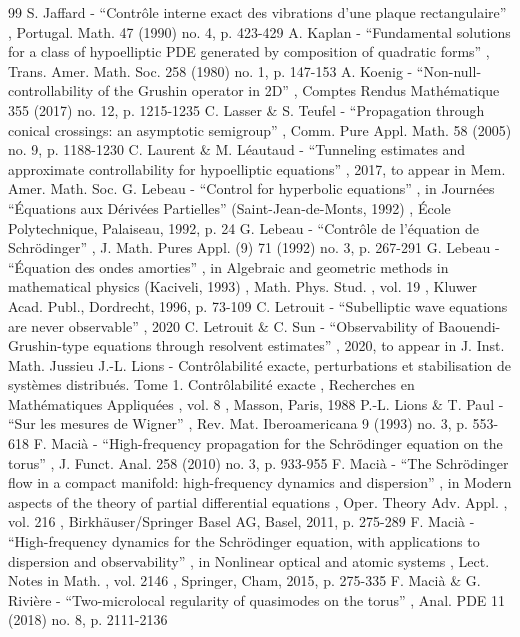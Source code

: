 \begin{thebibliography}{99}
 S. Jaffard - “Contrôle interne exact des vibrations d’une plaque rectangulaire” , Portugal. Math. 47 (1990) no. 4, p. 423-429
 A. Kaplan - “Fundamental solutions for a class of hypoelliptic PDE generated by composition of quadratic forms” , Trans. Amer. Math. Soc. 258 (1980) no. 1, p. 147-153
 A. Koenig - “Non-null-controllability of the Grushin operator in 2D” , Comptes Rendus Mathématique 355 (2017) no. 12, p. 1215-1235
 C. Lasser \& S. Teufel - “Propagation through conical crossings: an asymptotic semigroup” , Comm. Pure Appl. Math. 58 (2005) no. 9, p. 1188-1230
 C. Laurent \& M. Léautaud - “Tunneling estimates and approximate controllability for hypoelliptic equations” , 2017, to appear in Mem. Amer. Math. Soc.
 G. Lebeau - “Control for hyperbolic equations” , in Journées “Équations aux Dérivées Partielles” (Saint-Jean-de-Monts, 1992) , École Polytechnique, Palaiseau, 1992, p. 24
 G. Lebeau - “Contrôle de l’équation de Schrödinger” , J. Math. Pures Appl. (9) 71 (1992) no. 3, p. 267-291
 G. Lebeau - “Équation des ondes amorties” , in Algebraic and geometric methods in mathematical physics (Kaciveli, 1993) , Math. Phys. Stud. , vol. 19 , Kluwer Acad. Publ., Dordrecht, 1996, p. 73-109
 C. Letrouit - “Subelliptic wave equations are never observable” , 2020
 C. Letrouit \& C. Sun - “Observability of Baouendi-Grushin-type equations through resolvent estimates” , 2020, to appear in J. Inst. Math. Jussieu
 J.-L. Lions - Contrôlabilité exacte, perturbations et stabilisation de systèmes distribués. Tome 1. Contrôlabilité exacte , Recherches en Mathématiques Appliquées , vol. 8 , Masson, Paris, 1988
 P.-L. Lions \& T. Paul - “Sur les mesures de Wigner” , Rev. Mat. Iberoamericana 9 (1993) no. 3, p. 553-618
 F. Macià - “High-frequency propagation for the Schrödinger equation on the torus” , J. Funct. Anal. 258 (2010) no. 3, p. 933-955
 F. Macià - “The Schrödinger flow in a compact manifold: high-frequency dynamics and dispersion” , in Modern aspects of the theory of partial differential equations , Oper. Theory Adv. Appl. , vol. 216 , Birkhäuser/Springer Basel AG, Basel, 2011, p. 275-289
 F. Macià - “High-frequency dynamics for the Schrödinger equation, with applications to dispersion and observability” , in Nonlinear optical and atomic systems , Lect. Notes in Math. , vol. 2146 , Springer, Cham, 2015, p. 275-335
 F. Macià \& G. Rivière - “Two-microlocal regularity of quasimodes on the torus” , Anal. PDE 11 (2018) no. 8, p. 2111-2136

\end{thebibliography}
